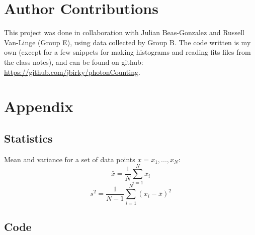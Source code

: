 \documentclass[onecolumn]{aastex62}
\begin{document}
\section{Author Contributions}

This project was done in collaboration with Julian Beas-Gonzalez and Russell Van-Linge (Group E), using data collected by Group B. The code written is my own (except for a few snippets for making histograms and reading fits files from the class notes), and can be found on github: \href{https://github.com/jbirky/photonCounting}{https://github.com/jbirky/photonCounting}.

\section{Appendix}

\subsection{Statistics}
Mean and variance for a set of data points $x={x_1, ...,x_N}$:
\begin{equation}
	\bar{x} = \frac{1}{N} \sum^N_{i=1} x_i  
\end{equation}
\begin{equation}
	s^2 = \frac{1}{N-1} \sum^N_{i=1} (x_i - \bar{x})^2
\end{equation}

\subsection{Code}


\end{document}
